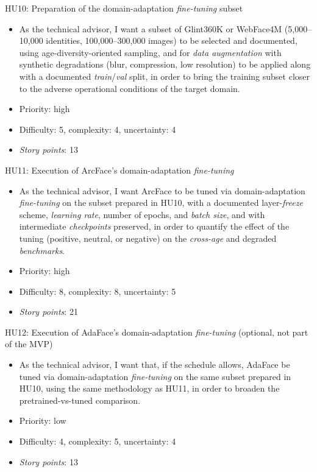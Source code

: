 \documentclass[
  11pt, %
]{charter}
\begin{document}
HU10: Preparation of the domain-adaptation \textit{fine-tuning} subset
\begin{itemize}
  \item As the technical advisor, I want a subset of Glint360K or WebFace4M (5,000--10,000 identities, 100,000--300,000 images) to be selected and documented, using age-diversity-oriented sampling, and for \textit{data augmentation} with synthetic degradations (blur, compression, low resolution) to be applied along with a documented \textit{train}/\textit{val} split, in order to bring the training subset closer to the adverse operational conditions of the target domain.
  \item Priority: high
  \item Difficulty: 5, complexity: 4, uncertainty: 4
  \item \textit{Story points}: 13
\end{itemize}

HU11: Execution of ArcFace's domain-adaptation \textit{fine-tuning}
\begin{itemize}
  \item As the technical advisor, I want ArcFace to be tuned via domain-adaptation \textit{fine-tuning} on the subset prepared in HU10, with a documented layer-\textit{freeze} scheme, \textit{learning rate}, number of epochs, and \textit{batch size}, and with intermediate \textit{checkpoints} preserved, in order to quantify the effect of the tuning (positive, neutral, or negative) on the \textit{cross-age} and degraded \textit{benchmarks}.
  \item Priority: high
  \item Difficulty: 8, complexity: 8, uncertainty: 5
  \item \textit{Story points}: 21
\end{itemize}

HU12: Execution of AdaFace's domain-adaptation \textit{fine-tuning} (optional, not part of the MVP)
\begin{itemize}
  \item As the technical advisor, I want that, if the schedule allows, AdaFace be tuned via domain-adaptation \textit{fine-tuning} on the same subset prepared in HU10, using the same methodology as HU11, in order to broaden the pretrained-vs-tuned comparison.
  \item Priority: low
  \item Difficulty: 4, complexity: 5, uncertainty: 4
  \item \textit{Story points}: 13
\end{itemize}
\end{document}
